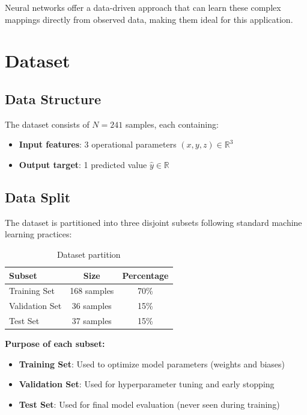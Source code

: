 \documentclass[12pt,a4paper]{article}
\begin{document}
Neural networks offer a data-driven approach that can learn these complex mappings directly from observed data, making them ideal for this application.

\section{Dataset}

\subsection{Data Structure}

The dataset consists of $N = 241$ samples, each containing:
\begin{itemize}
    \item \textbf{Input features}: 3 operational parameters $(x, y, z) \in \mathbb{R}^3$
    \item \textbf{Output target}: 1 predicted value $\hat{y} \in \mathbb{R}$
\end{itemize}

\subsection{Data Split}

The dataset is partitioned into three disjoint subsets following standard machine learning practices:

\begin{table}[H]
\centering
\begin{tabular}{@{}lcc@{}}
\toprule
\textbf{Subset} & \textbf{Size} & \textbf{Percentage} \\ \midrule
Training Set & 168 samples & 70\% \\
Validation Set & 36 samples & 15\% \\
Test Set & 37 samples & 15\% \\ \bottomrule
\end{tabular}
\caption{Dataset partition}
\label{tab:data_split}
\end{table}

\textbf{Purpose of each subset:}
\begin{itemize}
    \item \textbf{Training Set}: Used to optimize model parameters (weights and biases)
    \item \textbf{Validation Set}: Used for hyperparameter tuning and early stopping
    \item \textbf{Test Set}: Used for final model evaluation (never seen during training)
\end{itemize}
\end{document}
